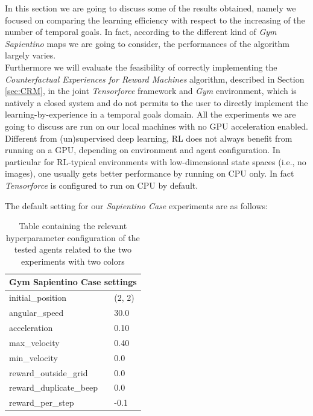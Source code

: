 \documentclass{article}
\begin{document}
In this section we are going to discuss some of the results obtained, namely we focused on comparing the learning efficiency with respect to the increasing of the number of temporal goals. In fact, according to the different kind of \textit{Gym Sapientino} maps we are going to consider, the performances of the algorithm largely varies.\\
Furthermore we will evaluate the feasibility of correctly implementing the \textit{Counterfactual Experiences for Reward Machines} algorithm, described in Section \ref{sec:CRM}, in the joint \textit{Tensorforce} framework and \textit{Gym} environment, which is natively a closed system and do not permits to the user to directly implement the learning-by-experience in a temporal goals domain.
All the experiments we are going to discuss are run on our local machines with no GPU acceleration enabled. Different from (un)supervised deep learning, RL does not always benefit from running on a GPU, depending on environment and agent configuration. In particular for RL-typical environments with low-dimensional state spaces (i.e., no images), one usually gets better performance by running on CPU only. In fact \textit{Tensorforce} is configured to run on CPU by default.

The default setting for our \textit{Sapientino Case} experiments are as follows:

\begin{table}[h]
\centering
\begin{tabular}{|p{4cm} |p{2cm}|}
 \hline
 \multicolumn{2}{|c|}{Gym Sapientino Case settings} \\
  \hline
initial\_position & (2, 2)\\
 \hline
angular\_speed & 30.0\\
 \hline
acceleration & 0.10\\
 \hline
max\_velocity & 0.40\\
 \hline
min\_velocity & 0.0\\
 \hline
reward\_outside\_grid & 0.0\\
 \hline
reward\_duplicate\_beep & 0.0\\
 \hline
reward\_per\_step & -0.1\\
  \hline
\end{tabular}
\caption{Table containing the relevant hyperparameter configuration of the tested agents related to the two experiments with two colors}
\end{table}

\end{document}
